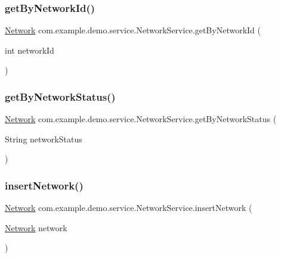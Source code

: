 \subsubsection{\texorpdfstring{get\+By\+Network\+Id()}{getByNetworkId()}}
{\footnotesize\ttfamily \mbox{\hyperlink{classcom_1_1example_1_1demo_1_1modular_1_1_network}{Network}} com.\+example.\+demo.\+service.\+Network\+Service.\+get\+By\+Network\+Id (\begin{DoxyParamCaption}\item[{int}]{network\+Id }\end{DoxyParamCaption})}

\mbox{\label{classcom_1_1example_1_1demo_1_1service_1_1_network_service_a532bf50eb10532dadc9f2a0644d319ae}} 
\subsubsection{\texorpdfstring{get\+By\+Network\+Status()}{getByNetworkStatus()}}
{\footnotesize\ttfamily \mbox{\hyperlink{classcom_1_1example_1_1demo_1_1modular_1_1_network}{Network}} com.\+example.\+demo.\+service.\+Network\+Service.\+get\+By\+Network\+Status (\begin{DoxyParamCaption}\item[{String}]{network\+Status }\end{DoxyParamCaption})}

\mbox{\label{classcom_1_1example_1_1demo_1_1service_1_1_network_service_a5fb1c25ef8943ce2dee62266c6ca9068}} 
\subsubsection{\texorpdfstring{insert\+Network()}{insertNetwork()}}
{\footnotesize\ttfamily \mbox{\hyperlink{classcom_1_1example_1_1demo_1_1modular_1_1_network}{Network}} com.\+example.\+demo.\+service.\+Network\+Service.\+insert\+Network (\begin{DoxyParamCaption}\item[{\mbox{\hyperlink{classcom_1_1example_1_1demo_1_1modular_1_1_network}{Network}}}]{network }\end{DoxyParamCaption})}



